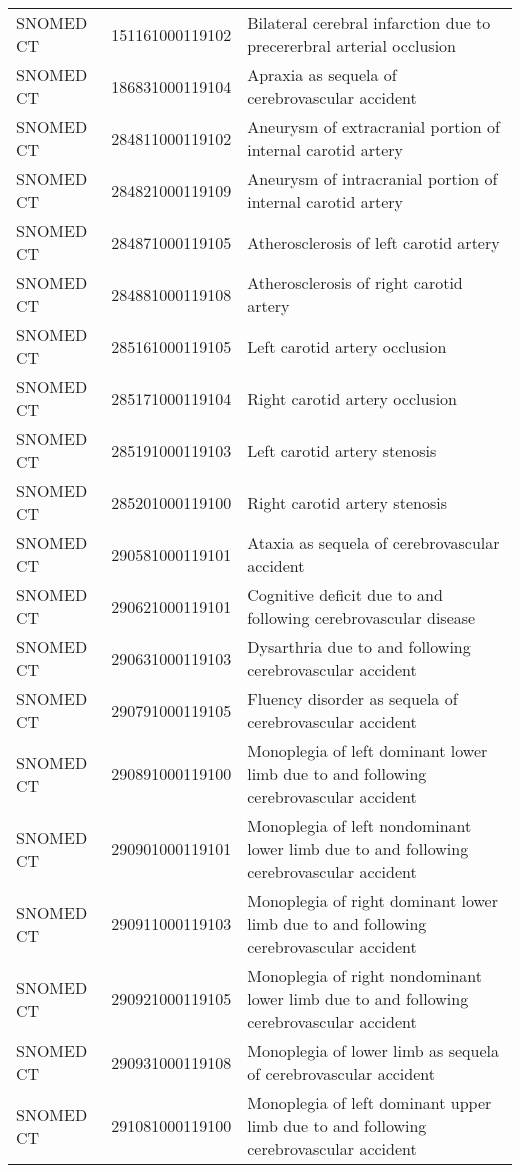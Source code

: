 \begin{longtable}{p{}p{}p{}}
  SNOMED CT & 151161000119102 & Bilateral cerebral infarction due to precererbral arterial occlusion \\ 
  SNOMED CT & 186831000119104 & Apraxia as sequela of cerebrovascular accident \\ 
  SNOMED CT & 284811000119102 & Aneurysm of extracranial portion of internal carotid artery \\ 
  SNOMED CT & 284821000119109 & Aneurysm of intracranial portion of internal carotid artery \\ 
  SNOMED CT & 284871000119105 & Atherosclerosis of left carotid artery \\ 
  SNOMED CT & 284881000119108 & Atherosclerosis of right carotid artery \\ 
  SNOMED CT & 285161000119105 & Left carotid artery occlusion \\ 
  SNOMED CT & 285171000119104 & Right carotid artery occlusion \\ 
  SNOMED CT & 285191000119103 & Left carotid artery stenosis \\ 
  SNOMED CT & 285201000119100 & Right carotid artery stenosis \\ 
  SNOMED CT & 290581000119101 & Ataxia as sequela of cerebrovascular accident \\ 
  SNOMED CT & 290621000119101 & Cognitive deficit due to and following cerebrovascular disease \\ 
  SNOMED CT & 290631000119103 & Dysarthria due to and following cerebrovascular accident \\ 
  SNOMED CT & 290791000119105 & Fluency disorder as sequela of cerebrovascular accident \\ 
  SNOMED CT & 290891000119100 & Monoplegia of left dominant lower limb due to and following cerebrovascular accident \\ 
  SNOMED CT & 290901000119101 & Monoplegia of left nondominant lower limb due to and following cerebrovascular accident \\ 
  SNOMED CT & 290911000119103 & Monoplegia of right dominant lower limb due to and following cerebrovascular accident \\ 
  SNOMED CT & 290921000119105 & Monoplegia of right nondominant lower limb due to and following cerebrovascular accident \\ 
  SNOMED CT & 290931000119108 & Monoplegia of lower limb as sequela of cerebrovascular accident \\ 
  SNOMED CT & 291081000119100 & Monoplegia of left dominant upper limb due to and following cerebrovascular accident \\ 

\end{longtable}

